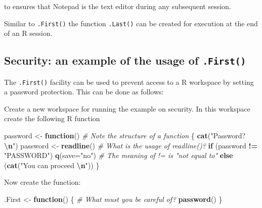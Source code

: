 \documentclass[
]{book}
\newenvironment{Shaded}{\begin{snugshade}}{\end{snugshade}}
\newcommand{\AttributeTok}[1]{\textcolor[rgb]{0.13,0.29,0.53}{#1}}
\newcommand{\CommentTok}[1]{\textcolor[rgb]{0.56,0.35,0.01}{\textit{#1}}}
\newcommand{\ControlFlowTok}[1]{\textcolor[rgb]{0.13,0.29,0.53}{\textbf{#1}}}
\newcommand{\FunctionTok}[1]{\textcolor[rgb]{0.13,0.29,0.53}{\textbf{#1}}}
\newcommand{\NormalTok}[1]{#1}
\newcommand{\OtherTok}[1]{\textcolor[rgb]{0.56,0.35,0.01}{#1}}
\newcommand{\SpecialCharTok}[1]{\textcolor[rgb]{0.81,0.36,0.00}{\textbf{#1}}}
\newcommand{\StringTok}[1]{\textcolor[rgb]{0.31,0.60,0.02}{#1}}
\begin{document}
to ensures that Notepad is the text editor during any subsequent session.

Similar to \texttt{.First()} the function \texttt{.Last()} can be created for execution at the end of an R session.

\subsection{\texorpdfstring{Security: an example of the usage of \texttt{.First()}}{Security: an example of the usage of .First()}}\label{security-an-example-of-the-usage-of-.first}

The \texttt{.First()} facility can be used to prevent access to a R workspace by setting a password protection. This can be done as follows:

Create a new workspace for running the example on security. In this workspace create the following R function

\begin{Shaded}
\begin{Highlighting}[]
\NormalTok{password }\OtherTok{\textless{}{-}} \ControlFlowTok{function}\NormalTok{()        }\CommentTok{\# Note the structure of a function}
\NormalTok{\{ }\FunctionTok{cat}\NormalTok{(}\StringTok{"Password? }\SpecialCharTok{\textbackslash{}n}\StringTok{"}\NormalTok{)}
\NormalTok{  password }\OtherTok{\textless{}{-}} \FunctionTok{readline}\NormalTok{()      }\CommentTok{\# What is the usage of readline()? }
  \ControlFlowTok{if}\NormalTok{ (password }\SpecialCharTok{!=} \StringTok{"PASSWORD"}\NormalTok{) }
    \FunctionTok{q}\NormalTok{(}\AttributeTok{save=}\StringTok{"no"}\NormalTok{)              }\CommentTok{\# The meaning of !=  is "not equal to"}
  \ControlFlowTok{else}\NormalTok{ (}\FunctionTok{cat}\NormalTok{(}\StringTok{"You can proceed }\SpecialCharTok{\textbackslash{}n}\StringTok{"}\NormalTok{))}
\NormalTok{\}               }
\end{Highlighting}
\end{Shaded}

Now create the function:

\begin{Shaded}
\begin{Highlighting}[]
\NormalTok{.First }\OtherTok{\textless{}{-}} \ControlFlowTok{function}\NormalTok{()}
\NormalTok{\{   }\CommentTok{\#  What must you be careful of?}
   \FunctionTok{password}\NormalTok{()}
\NormalTok{\}}
\end{Highlighting}
\end{Shaded}
\end{document}
